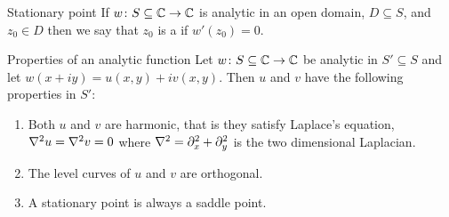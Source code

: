 \documentclass{article}
\begin{document}
     \begin{definition}{Stationary point}{}
        If \(w\colon S\subseteq \mathbb{C} \to \mathbb{C}\) is analytic in an open domain, \(D\subseteq S\), and \(z_0\in D\) then we say that \(z_0\) is a  if \(w'(z_0) = 0\).
    \end{definition}
    \begin{theorem}{Properties of an analytic function}{}
        Let \(w\colon S\subseteq\mathbb{C}\to\mathbb{C}\) be analytic in \(S'\subseteq S\) and let \(w(x + iy) = u(x, y) + iv(x, y)\).
        Then \(u\) and \(v\) have the following properties in \(S'\):
        \begin{enumerate}[label=(\roman*)]
            \item Both \(u\) and \(v\) are harmonic, that is they satisfy Laplace's equation, \(\nabla^2 u = \nabla^2 v = 0\) where \(\nabla^2 = \partial_x^2 + \partial_y^2\) is the two dimensional Laplacian.
            \item The level curves of \(u\) and \(v\) are orthogonal.
            \item A stationary point is always a saddle point.
        \end{enumerate}
    \end{theorem}
\end{document}

